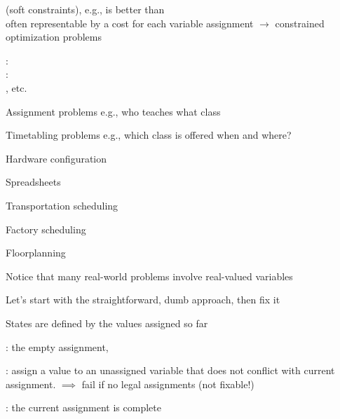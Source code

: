 \documentclass{article}
\begin{document}
\begin{huge}
 (soft constraints), e.g.,  is better than \\
often representable by a cost for each variable assignment\al
$\rightarrow$ constrained optimization problems



\vspace*{0.3in}

\textwidth
{}

: \\
: \\
\al
{}\al
{}, etc.




Assignment problems\al
    e.g., who teaches what class

Timetabling problems\al
    e.g., which class is offered when and where?

Hardware configuration

Spreadsheets

Transportation scheduling

Factory scheduling

Floorplanning

\vspace*{0.3in}

Notice that many real-world problems involve real-valued variables



Let's start with the straightforward, dumb approach, then fix it

States are defined by the values assigned so far

\blob {}: the empty assignment, \mat{$\emptyset$}

\blob {}: assign a value to an unassigned variable\nl
that does not conflict with current assignment.\nl
$\implies$ fail if no legal assignments (not fixable!)

\blob {}: the current assignment is complete


\end{huge}
\end{document}
